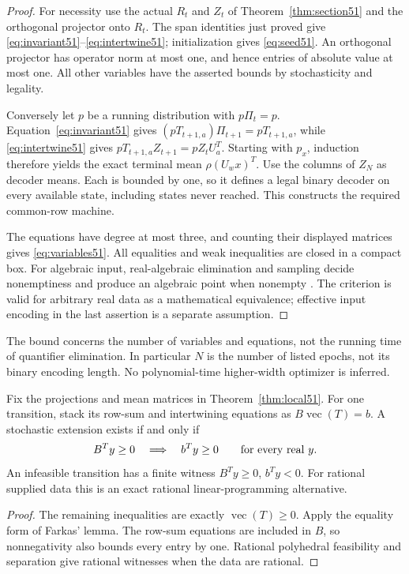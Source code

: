 \begin{proof}
For necessity use the actual $R_t$ and $Z_t$ of
Theorem~\ref{thm:section51} and the orthogonal projector onto $R_t$.
The span identities just proved give
\eqref{eq:invariant51}--\eqref{eq:intertwine51}; initialization gives
\eqref{eq:seed51}. An orthogonal projector has operator norm at most
one, and hence entries of absolute value at most one. All other
variables have the asserted bounds by stochasticity and legality.

Conversely let $p$ be a running distribution with $p\Pi_t=p$.
Equation~\eqref{eq:invariant51} gives
$(pT_{t+1,a})\Pi_{t+1}=pT_{t+1,a}$, while
\eqref{eq:intertwine51} gives
$pT_{t+1,a}Z_{t+1}=pZ_tU_a^T$. Starting with $p_x$, induction
therefore yields the exact terminal mean $\rho(U_wx)^T$. Use the
columns of $Z_N$ as decoder means. Each is bounded by one, so it
defines a legal binary decoder on every available state, including
states never reached. This constructs the required common-row machine.

The equations have degree at most three, and counting their displayed
matrices gives \eqref{eq:variables51}. All equalities and weak
inequalities are closed in a compact box. For algebraic input,
real-algebraic elimination and sampling decide nonemptiness and produce
an algebraic point when nonempty \cite{BPR}. The criterion is valid for
arbitrary real data as a mathematical equivalence; effective input
encoding in the last assertion is a separate assumption.
\end{proof}

The bound concerns the number of variables and equations, not the
running time of quantifier elimination. In particular $N$ is the
number of listed epochs, not its binary encoding length. No
polynomial-time higher-width optimizer is inferred.

\begin{proposition}\label{prop:dual51}
Fix the projections and mean matrices in
Theorem~\ref{thm:local51}. For one transition, stack its row-sum and
intertwining equations as $B\operatorname{vec}(T)=b$. A stochastic
extension exists if and only if
\[
 B^Ty\ge0\quad\Longrightarrow\quad b^Ty\ge0
 \qquad\hbox{for every real }y.
\]
An infeasible transition has a finite witness $B^Ty\ge0$, $b^Ty<0$.
For rational supplied data this is an exact rational linear-programming
alternative.
\end{proposition}
\begin{proof}
The remaining inequalities are exactly
$\operatorname{vec}(T)\ge0$. Apply the equality form of Farkas'
lemma. The row-sum equations are included in $B$, so nonnegativity
also bounds every entry by one. Rational polyhedral feasibility and
separation give rational witnesses when the data are rational.
\end{proof}

